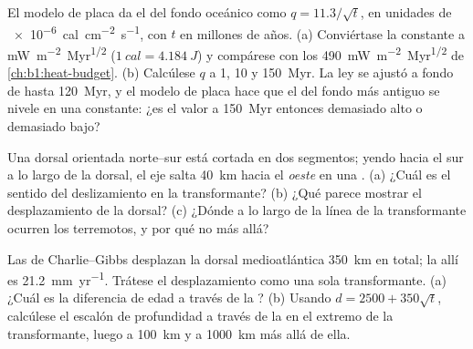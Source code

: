\begin{exercise}[$\star\star$]\label{exo:b1:rifts-ridges-margins:7}
El modelo de placa da el  del fondo oceánico como $q = 11.3/\sqrt t$, en unidades de \qty{e-6}{cal.cm^{-2}.s^{-1}}, con $t$ en
millones de años. (a) Conviértase la constante a \unit{mW.m^{-2}.Myr^{1/2}} ($\qty{1}{cal} =
\qty{4.184}{J}$) y compárese con los \qty{490}{mW.m^{-2}.Myr^{1/2}} de \cref{ch:b1:heat-budget}. (b) Calcúlese $q$ a 1, 10 y \qty{150}{Myr}.
La ley se ajustó a fondo de hasta \qty{120}{Myr}, y el modelo de placa hace que el  del fondo más antiguo se nivele en una
constante: ¿es el valor a \qty{150}{Myr} entonces demasiado alto o demasiado bajo?
\end{exercise}

\begin{exercise}[$\star\star$]\label{exo:b1:rifts-ridges-margins:8}
Una dorsal orientada norte--sur está cortada en dos segmentos; yendo hacia el sur a lo largo de la dorsal, el eje salta \qty{40}{km} hacia el
\emph{oeste} en una . (a) ¿Cuál es el sentido del deslizamiento en la transformante? (b) ¿Qué parece mostrar el
desplazamiento de la dorsal? (c) ¿Dónde a lo largo de la línea de la transformante ocurren los terremotos, y por qué no más allá?
\end{exercise}

\begin{exercise}[$\star\star$]\label{exo:b1:rifts-ridges-margins:9}
Las  de Charlie--Gibbs desplazan la dorsal medioatlántica \qty{350}{km} en total; la  allí es
\qty{21.2}{mm.yr^{-1}}. Trátese el desplazamiento como una sola transformante. (a) ¿Cuál es la diferencia de edad a través de la ? (b) Usando $d = 2500 + 350\sqrt t$, calcúlese el escalón de profundidad a través de la  en el extremo de la
transformante, luego a \qty{100}{km} y a \qty{1000}{km} más allá de ella.
\end{exercise}

